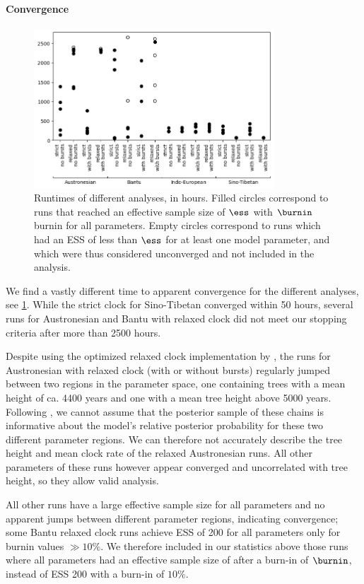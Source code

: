 \documentclass[]{rsos}%
\begin{document}
\paragraph{Convergence}
\begin{figure}
  \centering
  \includegraphics[width=0.8\textwidth]{supplement/analysis/runtimes.png}
  \caption{Runtimes of different analyses, in hours. Filled circles correspond to runs that reached an effective sample size of $\ess$ with $\burnin$ burnin for all parameters. Empty circles correspond to runs which had an ESS of less than $\ess$ for at least one model parameter, and which were thus considered unconverged and not included in the analysis.}\label{f:runtimes}
\end{figure}
We find a vastly different time to apparent convergence for the different
analyses, see \cref{f:runtimes}. While the strict clock for Sino-Tibetan converged within 50 hours,
several runs for Austronesian and Bantu with relaxed clock did not meet our
stopping criteria after more than 2500 hours.

Despite using the optimized relaxed clock
implementation by \textcite{orc}, the runs for Austronesian with relaxed clock
(with or without bursts) regularly jumped between two regions in the parameter
space, one containing trees with a mean height of ca. 4400 years and one with a
mean tree height above 5000 years. Following \textcite{brown2018behavior}, we cannot
assume that the posterior sample of these chains is informative about the
model's relative posterior probability for these two different parameter regions.
We can therefore not accurately describe the tree height and mean clock rate of
the relaxed Austronesian runs. All other parameters of these runs however appear
converged and uncorrelated with tree height, so they allow valid analysis.

All other runs have a large effective sample size for all parameters
and no apparent jumps between different parameter regions,
indicating convergence; some Bantu relaxed clock runs achieve
ESS of 200 for all parameters only for burnin values $\gg 10\%$.
We therefore included in our statistics above those runs where all parameters had an effective sample size of \ess after a burn-in of $\burnin$, instead of ESS 200 with a burn-in of $10\%$.
\end{document}
